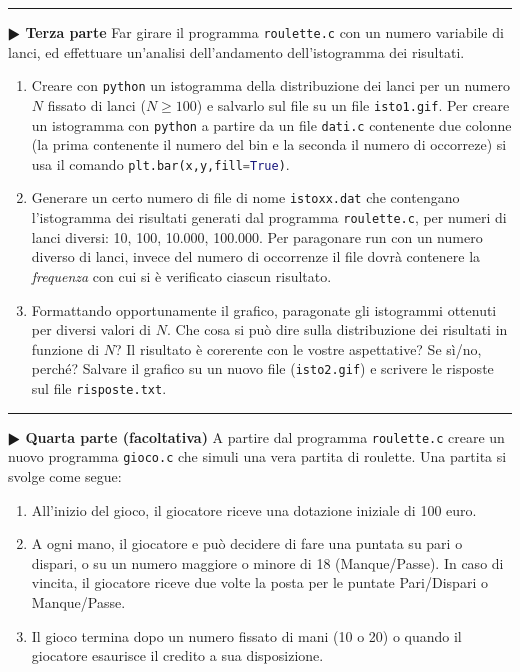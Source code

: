 \documentclass[11pt]{article}
\begin{document}
\hrule
\vspace{2mm}
\textbf{$\RHD$ Terza parte}
Far girare il programma \texttt{roulette.c} con un numero variabile di lanci,
ed effettuare un'analisi dell'andamento dell'istogramma dei risultati.
\begin{enumerate}
\item Creare con \texttt{python} un istogramma della distribuzione dei lanci per un numero $N$ fissato di lanci ($N \ge 100$) e salvarlo sul file su un file \texttt{isto1.gif}.
  Per creare un istogramma con \texttt{python} a partire da un file \texttt{dati.c} contenente due colonne (la prima
  contenente il numero del bin e la seconda il numero di occorreze)
si usa il comando \lstinline[language=Python]{plt.bar(x,y,fill=True)}.
\item Generare un certo numero di file di nome \texttt{istoxx.dat} che contengano l'istogramma dei risultati generati dal programma \texttt{roulette.c}, per numeri di lanci diversi: 10, 100, 10.000, 100.000.
 Per paragonare run con un numero diverso di lanci, invece del numero di occorrenze il file dovr\`a contenere
la {\em frequenza} con cui si \`e verificato ciascun risultato.
\item Formattando opportunamente il grafico, paragonate gli istogrammi ottenuti per diversi valori di $N$. Che cosa si
pu\`o dire sulla distribuzione dei risultati in funzione di $N$? Il risultato \`e corerente con le vostre aspettative? Se s\`i/no, perch\'e? Salvare il grafico su un nuovo file (\texttt{isto2.gif}) e scrivere le risposte sul file \texttt{risposte.txt}.
\end{enumerate}


\hrule
\vspace{2mm}
\textbf{$\RHD$ Quarta parte (facoltativa)}
A partire dal programma \texttt{roulette.c} creare un nuovo programma \texttt{gioco.c} che simuli una vera
partita di roulette.
Una partita si svolge come segue:
\begin{enumerate}
\item All'inizio del gioco, il giocatore riceve una dotazione iniziale di 100 euro.
\item A ogni mano, il giocatore e pu\`o decidere di fare una puntata  su pari o dispari, o su un numero maggiore o minore di 18 (Manque/Passe). In caso di vincita, il giocatore riceve due volte la posta per le puntate Pari/Dispari o Manque/Passe.
\item Il gioco termina dopo un numero fissato di mani (10 o 20) o quando il giocatore esaurisce il credito a sua disposizione.
\end{enumerate}
\end{document}
